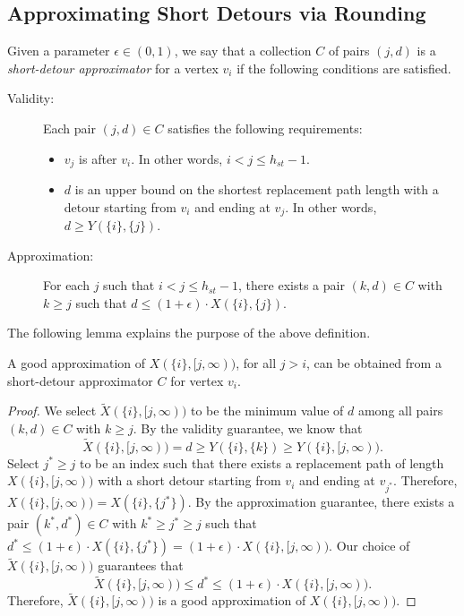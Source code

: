 \subsection{Approximating Short Detours via Rounding}\label{subsect:rounding}

Given a parameter $\epsilon \in (0,1)$, we say that a collection $C$ of pairs $(j,d)$ is a \emph{short-detour approximator} for a vertex $v_i$ if the following conditions are satisfied.
\begin{description}
    \item[Validity:] Each pair $(j,d) \in C$ satisfies the following requirements:
    \begin{itemize}
        \item $v_j$ is after $v_i$. In other words, $i < j \leq h_{st}-1$.
        \item $d$ is an upper bound on the shortest replacement path length with a detour starting from $v_i$ and ending at $v_j$. In other words, $d \geq Y(\{i\},\{j\})$. 
        \end{itemize}
    \item[Approximation:] For each $j$ such that $i < j \leq h_{st}-1$, there exists a  pair $(k,d) \in C$ with $k \geq j$ such that $d \leq (1+\epsilon) \cdot X(\{i\},\{j\})$.
\end{description}

The following lemma explains the purpose of the above definition.

\begin{lemma} A good approximation of $X(\{i\}, [j, \infty))$, for all $j > i$, can be obtained from a short-detour approximator $C$ for vertex $v_i$. \label{lem:obtaining_approx}
\end{lemma}
\begin{proof}
  We select $\widetilde{X}(\{i\}, [j, \infty))$ to be the minimum value of $d$ among all pairs $(k,d) \in C$ with $k \geq j$. By the validity guarantee, we know that 
  \[\widetilde{X}(\{i\}, [j, \infty)) = d \geq Y(\{i\},\{k\}) \geq Y(\{i\}, [j, \infty)).\]
Select $j^\ast \geq j$ to be an index such that there exists a replacement path of length $X(\{i\}, [j, \infty))$ with a short detour starting from $v_i$ and ending at $v_{j^\ast}$. Therefore, $X(\{i\}, [j, \infty)) = X(\{i\},\{j^\ast\})$.
By the approximation guarantee, there exists a  pair $(k^\ast,d^\ast) \in C$ with $k^\ast \geq j^\ast \geq j$ such that $d^\ast \leq (1+\epsilon) \cdot X(\{i\},\{j^\ast\}) = (1+\epsilon) \cdot X(\{i\}, [j, \infty))$. Our choice of $\widetilde{X}(\{i\}, [j, \infty))$ guarantees that 
\[\widetilde{X}(\{i\}, [j, \infty)) \leq d^\ast \leq (1+\epsilon) \cdot X(\{i\}, [j, \infty)).\]
Therefore, $\widetilde{X}(\{i\}, [j, \infty))$ is a good approximation of $X(\{i\}, [j, \infty))$.
\end{proof}

